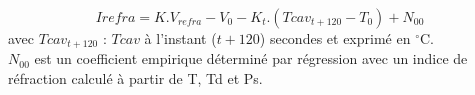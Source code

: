 
$$
Irefra = K.V_{refra} - V_0 - K_t.( Tcav_{t+120} - T_0 ) + N_{00}  
$$
avec $Tcav_{t+120}$ : $Tcav$ \`a l'instant ($t+120$) secondes
et exprim\'e en $^\circ$C.\\
$N_{00}$ est un coefficient empirique d\'etermin\'e par r\'egression avec un
indice de r\'efraction calcul\'e \`a partir de T, Td et Ps.
